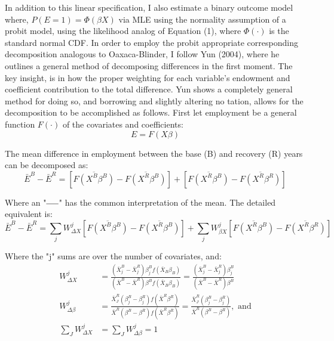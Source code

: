 \documentclass[11pt]{article}
\theoremstyle{definition}
\begin{document}
In addition to this linear specification, I also estimate  a binary outcome model where, $P(E=1)=\Phi(\beta X)$ via MLE using the normality assumption of a probit model, using the likelihood analog of Equation (1), where $\Phi(\cdot)$ is the standard normal CDF.  In order to employ the probit appropriate corresponding decomposition analogous to Oaxaca-Blinder, I follow Yun (2004), where he outlines a general method of decomposing differences in the first moment.  The key insight, is in how the proper weighting for each variable's endowment and coefficient contribution to the total difference.  Yun shows a completely general method for doing so, and borrowing and slightly altering no tation, allows for the decomposition to be accomplished as follows.  First let employment be a general function $F(\cdot)$ of the covariates and coefficients:
\begin{equation*}
E=F(X\beta)
\end{equation*}

The mean difference in employment between the base (B) and recovery (R) years can be decomposed as:
\begin{equation*}
\bar{E}^{B} - \bar{E}^{R} = \left[ \overline{F(X^{B}\beta^{B})} - \overline{F(X^{R}\beta^{B})}\right] + \left[ \overline{F(X^{R}\beta^{B})} - \overline{F(X^{R}\beta^{R})}\right]
\end{equation*}

Where an "$\overline{\hspace{5mm}}$" has the common interpretation of the mean.  The detailed equivalent is:
\begin{equation*}
\bar{E}^{B} - \bar{E}^{R} = \sum_{j} W^{j}_{\Delta X} \left[ \overline{F(X^{B}\beta^{B})} - \overline{F(X^{R}\beta^{B})}\right] + \sum_{j} W^{j}_{\beta X} \left[ \overline{F(X^{R}\beta^{B})} - \overline{F(X^{R}\beta^{R})}\right]
\end{equation*}

Where the "j" sums  are over the number of covariates, and:
\begin{equation*}
\begin{split}
W^j_{\Delta X} & = \frac{(\bar{X}^B_j - \bar{X}^R_j)\beta^{B}_{j}f(\bar{X}_{B}\beta_{B})}{(\bar{X}^B - \bar{X}^R)\beta^{B}f(\bar{X}_{B}\beta_{B})} = \frac{(\bar{X}^B_j - \bar{X}^R_j)\beta^{B}_{j}}{(\bar{X}^B - \bar{X}^R)\beta^B} \\
W^j_{\Delta \beta} & = \frac{\bar{X}^R_J(\beta^B_j - \beta^R_j)f(\bar{X}^R \beta^R)}{\bar{X}^R(\beta^B - \beta^R)f(\bar{X}^R \beta^R)} = \frac{\bar{X}^R_J(\beta^B_j - \beta^R_j)}{\bar{X}^R(\beta^B - \beta^R)}, \text{ and} \\
\sum_J W^j_{\Delta X} & = \sum_J W^j_{\Delta \beta} = 1 \\
\end{split}
\end{equation*} 
\end{document}
